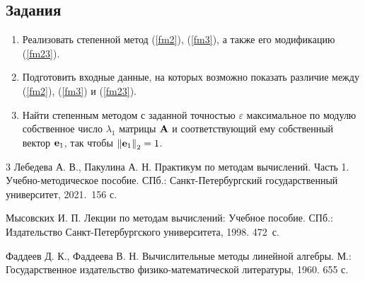 \documentclass[12pt]{article}
\begin{document}
	\subsection*{Задания}
	
	\begin{enumerate}
		\item Реализовать степенной метод (\ref{fm2}), (\ref{fm3}), а также его модификацию (\ref{fm23}).
		\item Подготовить входные данные, на которых возможно показать различие между (\ref{fm2}), (\ref{fm3}) и (\ref{fm23}).
		\item Найти степенным методом с заданной точностью $\varepsilon$ максимальное по модулю собственное число $\lambda_1$ матрицы $\bold{A}$ и соответствующий ему собственный вектор $\bold{e}_1$, так чтобы $\left\|\bold{e}_1\right\|_2=1$.
	\end{enumerate}
	
    \renewcommand{\bibname}{{Список литературы}}
    
    \begin{thebibliography}{3}
        Лебедева А. В., Пакулина А. Н. Практикум по методам вычислений. Часть 1. Учебно-методическое пособие. СПб.: Санкт-Петербургский государственный университет, 2021.~156 с.
        
        Мысовских И. П. Лекции по методам вычислений: Учебное пособие. СПб.: Издательство Санкт-Петербургского университета, 1998. 472~с.
        
        Фаддеев Д. К., Фаддеева В. Н. Вычислительные методы линейной алгебры. М.:  Государственное издательство физико-математической литературы, 1960. 655 с.
    \end{thebibliography}
\end{document}
